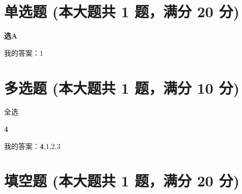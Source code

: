\documentclass[12pt, a4paper, addpoints]{exam}
\begin{document}
\pagestyle{headandfoot}

\begin{center}
\end{center}
\vspace{5mm}

\normalsize
\vspace{5mm}

\section{\normalsize{单选题 (本大题共 1 题，满分 20 分)}}
\hspace{1.5cm}

\begin{questions}
\question[20] \textbf{选A}

\begin{oneparchoices}
\end{oneparchoices}
我的答案：1

\end{questions}

\hspace{5cm}

\section{\normalsize{多选题 (本大题共 1 题，满分 10 分)}}
\hspace{1.5cm}
\begin{multicols}{2}
\begin{questions}
\question[10] 全选

\begin{checkboxes}
\choice \textbf{4}
\end{checkboxes}

我的答案：\textbf{4},1,2,3

\end{questions}
\end{multicols}

\hspace{5cm}

\section{\normalsize{填空题 (本大题共 1 题，满分 20 分)}}
\hspace{1.5cm}
\end{document}
